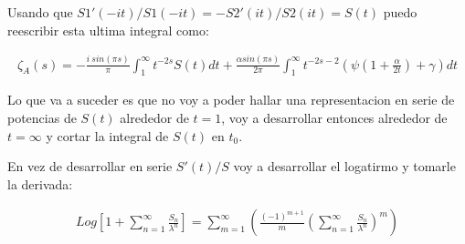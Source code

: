 \begin{comment}
A la hora de calcular los terminos de la forma $S'/S$ hay que tener en cuenta hasta que orden hay que llevar el numerado y el denominador para poder ser consitente con la expancion en serie.

\begin{equation}
\begin{array}{c}
\frac{S'(x)}{S(x)} =
\frac{
		- \sum _{n=1} ^{\infty} \frac{n a_n}{x ^{n+1}}
      }
      {
		1 + \sum _{m=1} ^{\infty} \frac{a _n}{x ^{n}}
            } =
            

\left(
	    - \sum _{n=1} ^{\infty} \frac{n a_n}{x ^{n+1}}
		\right)
\sum _{p =0} ^{\infty}
		\left(
			    \sum _{m=1} ^{\infty} \frac{a _n}{x ^{n}}
	    		\right) ^{p}
\end{array}
\end{equation}

Donde se puede hacer el producto de Cauchy para tener la solucion exacta de hasta que terminos hay que desarrollar $S,S'$ y la Serie Geometrica.
\end{comment}

Usando que $S1' (-it)/S1 (-i t) = - S2 ' (i t) / S2(it)  = S(t) $ puedo reescribir esta ultima integral como:

\begin{equation}
\begin{array}{c}
\zeta _A (s) =  
-  \frac{i \ sin (\pi s)}{\pi} \int _1 ^{\infty} t ^{-2s} S(t) dt + 
\frac{\alpha sin( \pi s )}{2 \pi } \int _{1} ^{\infty} 
t ^{-2s-2} \left( \psi (1 + \frac{\alpha}{2 t}) + \gamma \right) dt
\end{array}
\end{equation}

Lo que va a suceder es que no voy a poder hallar una representacion en serie de potencias de $S(t)$ alrededor de $t=1$, voy a desarrollar entonces alrededor de $t = \infty$ y cortar la integral de $S(t) $ en $t _0$.




En vez de desarrollar en serie $S'(t) /S$ voy a desarrollar el logatirmo y tomarle la derivada:

\begin{equation}
\begin{array}{c}

Log 
\left[
	1 + \sum _{n=1} ^{\infty}  \frac{S _n}{\lambda ^n}
	\right] =
	
\sum _{m = 1} ^{\infty} 
	\left(
	\frac{(-1) ^{m+1} }{m}
	\left(
		\sum _{n=1} ^{\infty} \frac{S _n}{\lambda ^n}
		\right) ^m 
	\right)
\end{array}	
\end{equation}

